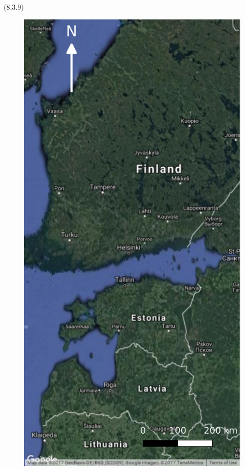 \documentclass[20pt]{beamer}
\begin{document}
\begin{frame}{}
	\begin{textblock}{7}(8,3.9)
		\Line
		
		\begin{figure}
		  \includegraphics[width=2.3\TPHorizModule]{../thesis/thesis-figures/figures-qgis/fulltile-google}

\end{figure}
\end{textblock}
\end{frame}
\end{document}
